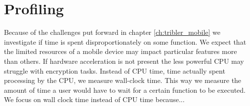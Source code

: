 \section{Profiling}\label{sec:profiling}
Because of the challenges put forward in chapter \ref{ch:tribler_mobile} we investigate if time is spent disproportionately on some function.
We expect that the limited resources of a mobile device may impact particular features more than others.
If hardware acceleration is not present the less powerful CPU may struggle with encryption tasks.
Instead of CPU time, time actually spent processing by the CPU, we measure wall-clock time.
This way we measure the amount of time a user would have to wait for a certain function to be executed.
We focus on wall clock time instead of CPU time because...

